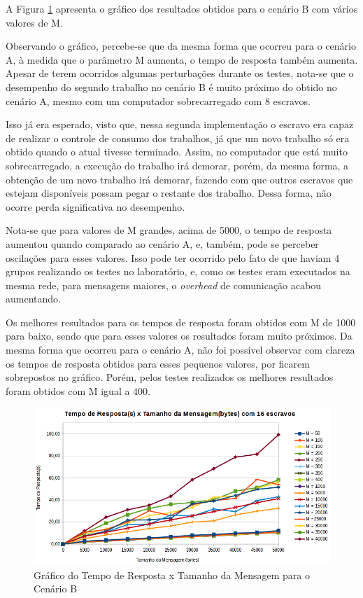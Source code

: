 \documentclass[
	12pt,				%
    oneside,			%
	a4paper,			%
	english,			%
	brazil,				%
	]{abntex2}
\begin{document}
A Figura \ref{fig:tempo_respostaXtamanho_msg_B} apresenta o gráfico dos resultados obtidos para o cenário B com vários valores de M.

Observando o gráfico, percebe-se que da mesma forma que ocorreu para o cenário A, à medida que o parâmetro M aumenta, o tempo de resposta também aumenta. Apesar de terem ocorridos algumas perturbações durante os testes, nota-se que o desempenho do segundo trabalho no cenário B é muito próximo do obtido no cenário A, mesmo com um computador sobrecarregado com 8 escravos. 

Isso já era esperado, visto que, nessa segunda implementação o escravo era capaz de realizar o controle de consumo dos trabalhos, já que um novo trabalho só era obtido quando o atual tivesse terminado. Assim, no computador que está muito sobrecarregado, a execução do trabalho irá demorar, porém, da mesma forma, a obtenção de um novo trabalho irá demorar, fazendo com que outros escravos que estejam disponíveis possam pegar o restante dos trabalho. Dessa forma, não ocorre perda significativa no desempenho.

Nota-se que para valores de M grandes, acima de 5000, o tempo de resposta aumentou quando comparado ao cenário A, e, também, pode se perceber oscilações para esses valores. Isso pode ter ocorrido pelo fato de que haviam 4 grupos realizando os testes no laboratório, e, como os testes eram executados na mesma rede, para mensagens maiores, o \textit{overhead} de comunicação acabou aumentando.

Os melhores resultados para os tempos de resposta foram obtidos com M de 1000 para baixo, sendo que para esses valores os resultados foram muito próximos. Da mesma forma que ocorreu para o cenário A, não foi possível observar com clareza os tempos de resposta obtidos para esses pequenos valores, por ficarem sobrepostos no gráfico. Porém, pelos testes realizados os melhores resultados foram obtidos com M igual a 400.

\begin{figure}[!htb]
\centering
\includegraphics[scale=0.7]{figuras/B.png}
\caption{Gráfico do Tempo de Resposta x Tamanho da Mensagem para o Cenário B}
\label{fig:tempo_respostaXtamanho_msg_B}
\end{figure}
\end{document}
